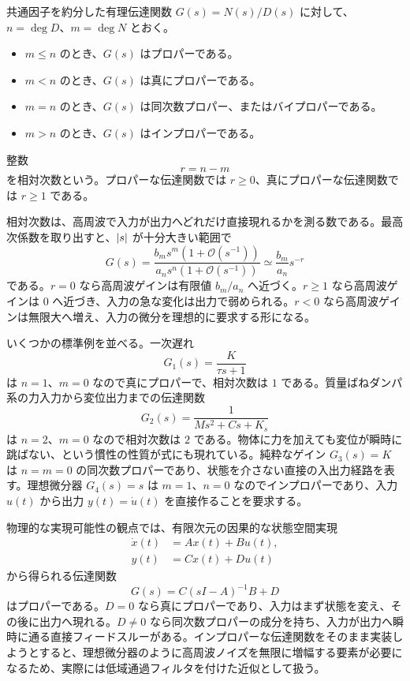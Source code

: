 \begin{definition}[プロパー性と相対次数]
共通因子を約分した有理伝達関数 $G(s)=N(s)/D(s)$ に対して、$n=\deg D$、$m=\deg N$ とおく。
\begin{itemize}
  \item $m\le n$ のとき、$G(s)$ はプロパーである。
  \item $m<n$ のとき、$G(s)$ は真にプロパーである。
  \item $m=n$ のとき、$G(s)$ は同次数プロパー、またはバイプロパーである。
  \item $m>n$ のとき、$G(s)$ はインプロパーである。
\end{itemize}
整数
\begin{equation}
  r=n-m
\end{equation}
を相対次数という。プロパーな伝達関数では $r\ge0$、真にプロパーな伝達関数では $r\ge1$ である。
\end{definition}

相対次数は、高周波で入力が出力へどれだけ直接現れるかを測る数である。最高次係数を取り出すと、$\left|s\right|$ が十分大きい範囲で
\begin{equation}
  G(s)
  =
  \frac{b_ms^m(1+\mathcal{O}(s^{-1}))}
       {a_ns^n(1+\mathcal{O}(s^{-1}))}
  \simeq
  \frac{b_m}{a_n}s^{-r}
  \label{eq:relative-degree-asymptote}
\end{equation}
である。$r=0$ なら高周波ゲインは有限値 $b_m/a_n$ へ近づく。$r\ge1$ なら高周波ゲインは 0 へ近づき、入力の急な変化は出力で弱められる。$r<0$ なら高周波ゲインは無限大へ増え、入力の微分を理想的に要求する形になる。

いくつかの標準例を並べる。一次遅れ
\begin{equation}
  G_1(s)=\frac{K}{\tau s+1}
\end{equation}
は $n=1$、$m=0$ なので真にプロパーで、相対次数は $1$ である。質量ばねダンパ系の力入力から変位出力までの伝達関数
\begin{equation}
  G_2(s)=\frac{1}{Ms^2+Cs+K_s}
\end{equation}
は $n=2$、$m=0$ なので相対次数は $2$ である。物体に力を加えても変位が瞬時に跳ばない、という慣性の性質が式にも現れている。純粋なゲイン $G_3(s)=K$ は $n=m=0$ の同次数プロパーであり、状態を介さない直接の入出力経路を表す。理想微分器 $G_4(s)=s$ は $m=1$、$n=0$ なのでインプロパーであり、入力 $u(t)$ から出力 $y(t)=\dot{u}(t)$ を直接作ることを要求する。

物理的な実現可能性の観点では、有限次元の因果的な状態空間実現
\begin{align}
  \dot{x}(t)&=Ax(t)+Bu(t),\\
  y(t)&=Cx(t)+Du(t)
\end{align}
から得られる伝達関数
\begin{equation}
  G(s)=C(sI-A)^{-1}B+D
\end{equation}
はプロパーである。$D=0$ なら真にプロパーであり、入力はまず状態を変え、その後に出力へ現れる。$D\neq0$ なら同次数プロパーの成分を持ち、入力が出力へ瞬時に通る直接フィードスルーがある。インプロパーな伝達関数をそのまま実装しようとすると、理想微分器のように高周波ノイズを無限に増幅する要素が必要になるため、実際には低域通過フィルタを付けた近似として扱う。

